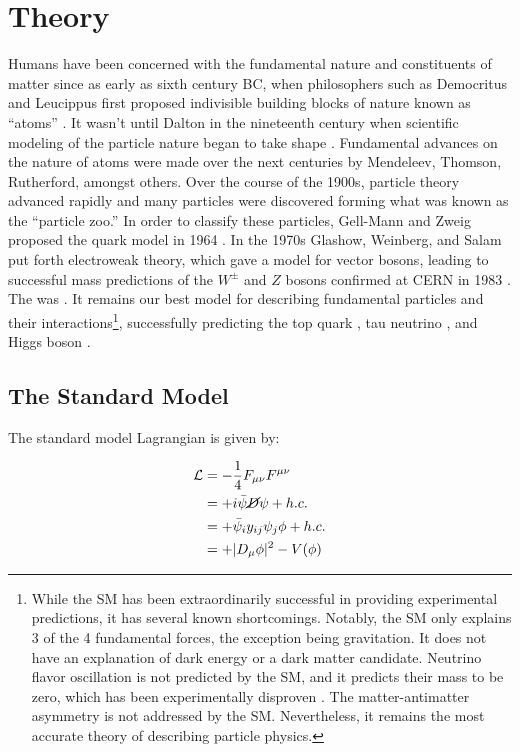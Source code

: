 \chapter{Theory}

    Humans have been concerned with the fundamental nature and constituents of matter since as early as sixth century BC, when philosophers such as Democritus and Leucippus first proposed indivisible building blocks of nature known as ``atoms'' \cite{democritus}. It wasn't until Dalton in the nineteenth century when scientific modeling of the particle nature began to take shape \cite{dalton}. Fundamental advances on the nature of atoms were made over the next centuries by Mendeleev, Thomson, Rutherford, amongst others. Over the course of the 1900s, particle theory advanced rapidly and many particles were discovered forming what was known as the ``particle zoo.'' In order to classify these particles, Gell-Mann and Zweig proposed the quark model in 1964 \cite{quark-model}. In the 1970s Glashow, Weinberg, and Salam put forth electroweak theory, which gave a model for vector bosons, leading to successful mass predictions of the $W^{\pm}$ and $Z$ bosons confirmed at \gls{CERN} in 1983 \cite{w-discovery, z-discovery}. The  was . It remains our best model for describing fundamental particles and their interactions\footnote{While the \gls{SM} has been extraordinarily successful in providing experimental predictions, it has several known shortcomings. Notably, the \gls{SM} only explains 3 of the 4 fundamental forces, the exception being gravitation. It does not have an explanation of dark energy or a dark matter candidate. Neutrino flavor oscillation is not predicted by the \gls{SM}, and it predicts their mass to be zero, which has been experimentally disproven \cite{neutrino-oscillation}. The matter-antimatter asymmetry is not addressed by the \gls{SM}. Nevertheless, it remains the most accurate theory of describing particle physics.}, successfully predicting the top quark \cite{top-quark}, tau neutrino \cite{tau-neutrino}, and Higgs boson \cite{higgs-discovery-atlas,higgs-discovery-cms}.
    

    \section{The Standard Model}

        The standard model Lagrangian is given by:

        \begin{equation}
            \begin{aligned}
                \mathcal{L} &= - \frac{1}{4} F_{\mu \nu} F^{\mu \nu} \\
                &=+ i \bar{\psi} \cancel{D} \psi + h.c. \\
                &=+ \bar{\psi}_i y_{ij} \psi_j \phi + h.c. \\
                &=+ |D_\mu \phi|^2 - V(\phi)
            \end{aligned}
        \end{equation}

